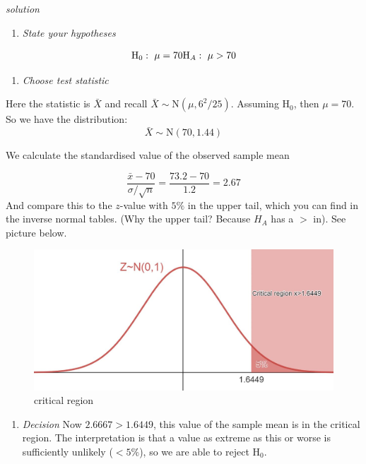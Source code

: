 \documentclass[
]{book}
\providecommand{\tightlist}{%
  \setlength{\itemsep}{0pt}\setlength{\parskip}{0pt}}
\theoremstyle{definition}
\theoremstyle{definition}
\theoremstyle{definition}
\theoremstyle{definition}
\theoremstyle{remark}
\begin{document}
\emph{solution}

\begin{enumerate}
\def\labelenumi{\arabic{enumi}.}
\tightlist
\item
  \emph{State your hypotheses}
\end{enumerate}

\[\text{H}_0: \ \mu = 70 \\  \text{H}_A: \ \mu > 70\]

\begin{enumerate}
\def\labelenumi{\arabic{enumi}.}
\setcounter{enumi}{1}
\tightlist
\item
  \emph{Choose test statistic}
\end{enumerate}

Here the statistic is \(\bar{X}\) and recall \(\bar{X}\sim\text{N}(\mu,6^2/25)\). Assuming \(\text{H}_{0}\), then \(\mu=70\). So we have the distribution: \[\bar{X}\sim\text{N}(70,1.44)\]

We calculate the standardised value of the observed sample mean

\[\frac{\bar{x} - 70}{\sigma /\sqrt{ n}}=\frac{73.2 - 70}{1.2} = 2.67\]
And compare this to the \(z\)-value with \(5\%\) in the upper tail, which you can find in the inverse normal tables. (Why the upper tail? Because \(H_{A}\) has a \(>\) in). See picture below.

\begin{figure}

{\centering \includegraphics[width=0.75\linewidth]{./figures/criticalregion} 

}

\caption{critical region}\label{fig:crit1}
\end{figure}

\begin{enumerate}
\def\labelenumi{\arabic{enumi}.}
\setcounter{enumi}{2}
\tightlist
\item
  \emph{Decision}
  Now \(2.6667 > 1.6449\), this value of the sample mean is in the critical region. The interpretation is that a value as extreme as this or worse is sufficiently unlikely (\(<5\%\)), so we are able to reject \(\text{H}_{0}\).
\end{enumerate}
\end{document}
